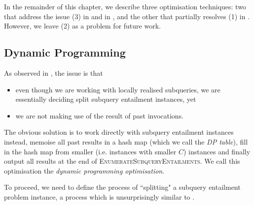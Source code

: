 \documentclass[12pt]{report}
\theoremstyle{plain}
\theoremstyle{definition}
\begin{document}
In the remainder of this chapter, we describe three optimisation techniques: two that address the issue (3) in  and in , and the other that partially resolves (1) in . However, we leave (2) as a problem for future work.

\subsection{Dynamic Programming}
\label{subsection:dp-optimisation}

As observed in , the issue is that
\begin{itemize}
  \item even though we are working with locally realised subqueries, we are essentially deciding split subquery entailment instances, yet
  \item we are not making use of the result of past invocations.
\end{itemize}

The obvious solution is to work directly with subquery entailment instances instead, memoise all past results in a hash map (which we call the \emph{DP table}), fill in the hash map from smaller (i.e. instances with smaller $C$) instances and finally output all results at the end of \textsc{EnumerateSubqueryEntailments}. We call this optimisation the \emph{dynamic programming optimisation}.

To proceed, we need to define the process of ``splitting" a subquery entailment problem instance, a process which is unsurprisingly similar to .
\end{document}
